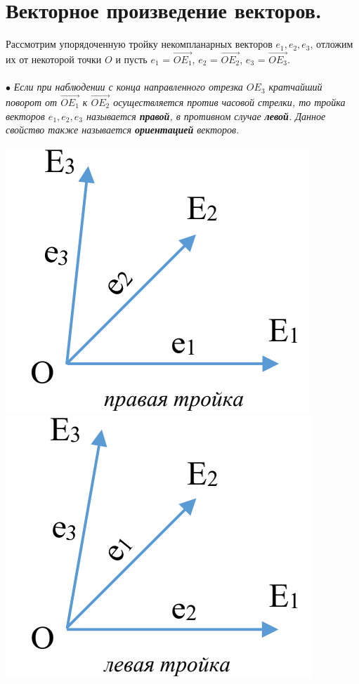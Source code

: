 \section{Векторное произведение векторов.}
Рассмотрим упорядоченную тройку некомпланарных векторов $e_1, e_2, e_3$, отложим их от некоторой точки $O$ и пусть $e_1$ = $\overrightarrow{O E_1}$, $e_2$ = $\overrightarrow{O E_2}$, $e_3$ = $\overrightarrow{O E_3}$.\\\\
$\bullet$\textit{ Если при наблюдении с конца направленного отрезка $O E_3$ кратчайший поворот от $\overrightarrow{O E_1}$ к $\overrightarrow{O E_2}$ осуществляется против часовой стрелки, то тройка векторов $e_1, e_2, e_3$ называется \textit{\textbf{правой}}, в противном случае \textit{\textbf{левой}}. Данное свойство также называется \textbf{ориентацией} векторов.}
\begin{center}
	\includegraphics[scale=0.4]{images/r_t_3_5.png}\qquad\qquad\qquad
	\includegraphics[scale=0.4]{images/l_t_3_5.png} 
\end{center}
